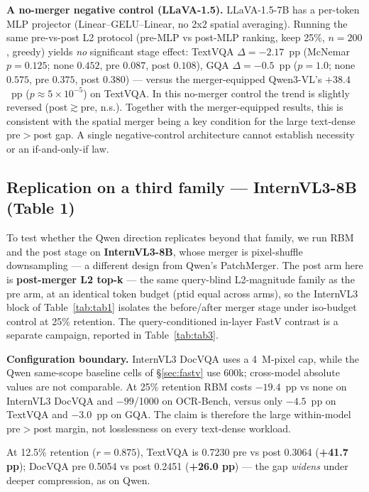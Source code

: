 \documentclass[journal]{IEEEtran}
\begin{document}
\textbf{A no-merger negative control (LLaVA-1.5).} LLaVA-1.5-7B has a per-token MLP projector
(Linear--GELU--Linear, no 2x2 spatial averaging). Running the same pre-vs-post
L2 protocol (pre-MLP vs post-MLP ranking, keep 25\%, $n{=}200$, greedy) yields
\emph{no} significant stage effect: TextVQA $\Delta = -2.17$~pp (McNemar
$p{=}0.125$; none $0.452$, pre $0.087$, post $0.108$), GQA $\Delta = -0.5$~pp
($p{=}1.0$; none $0.575$, pre $0.375$, post $0.380$) --- versus the
merger-equipped Qwen3-VL's $+38.4$~pp ($p{\approx}5{\times}10^{-5}$) on TextVQA.
In this no-merger control the trend is slightly reversed
(post$\gtrsim$pre, n.s.). Together with the merger-equipped results, this is
consistent with the spatial merger being a key condition for the large
text-dense pre$>$post gap. A single negative-control architecture cannot
establish necessity or an if-and-only-if law.

\subsection{Replication on a third family --- InternVL3-8B (Table 1)}\label{sec:internvl}

To test whether the Qwen direction replicates beyond that family, we run RBM
and the post stage on \textbf{InternVL3-8B},
whose merger is pixel-shuffle downsampling --- a different design from Qwen's
PatchMerger. The post arm here is \textbf{post-merger L2 top-k} --- the
same query-blind L2-magnitude family as the pre arm, at an identical
token budget (ptid equal across arms), so the InternVL3 block of
Table~\ref{tab:tab1} isolates the before/after merger stage under iso-budget
control at 25\% retention. The query-conditioned in-layer FastV contrast is a separate campaign,
reported in Table~\ref{tab:tab3}.

\textbf{Configuration boundary.} InternVL3 DocVQA uses a 4~M-pixel cap, while
the Qwen same-scope baseline cells of \S\ref{sec:fastv} use 600k; cross-model
absolute values are not comparable. At 25\% retention RBM costs $-19.4$~pp vs
none on InternVL3 DocVQA and $-99$/1000 on OCR-Bench, versus only $-4.5$~pp on
TextVQA and $-3.0$~pp on GQA. The claim is therefore the large within-model
pre$>$post margin, not losslessness on every text-dense workload.

At 12.5\% retention ($r=0.875$), TextVQA is 0.7230 pre
vs post 0.3064 (\textbf{+41.7 pp}); DocVQA pre 0.5054 vs post 0.2451
(\textbf{+26.0 pp}) --- the gap \emph{widens} under deeper compression, as on
Qwen.
\end{document}
